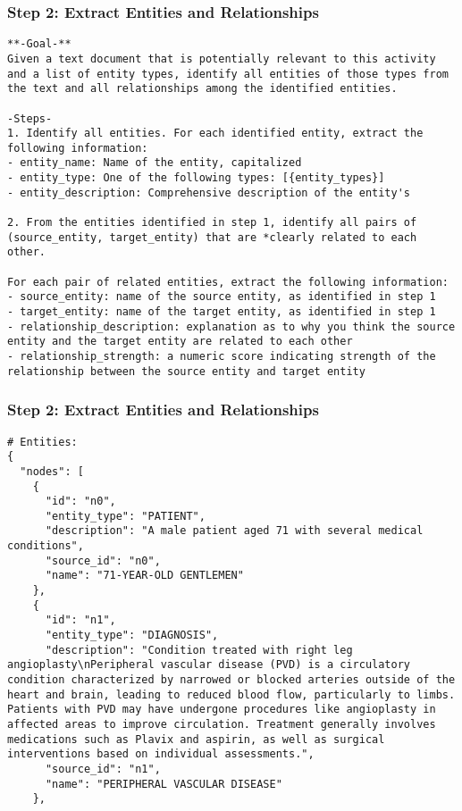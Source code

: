 \begin{frame}[fragile]\frametitle{Step 2: Extract Entities and Relationships}

    \begin{lstlisting}
**-Goal-**
Given a text document that is potentially relevant to this activity and a list of entity types, identify all entities of those types from the text and all relationships among the identified entities.
 
-Steps-
1. Identify all entities. For each identified entity, extract the following information:
- entity_name: Name of the entity, capitalized
- entity_type: One of the following types: [{entity_types}]
- entity_description: Comprehensive description of the entity's 

2. From the entities identified in step 1, identify all pairs of (source_entity, target_entity) that are *clearly related to each other.
 
For each pair of related entities, extract the following information:
- source_entity: name of the source entity, as identified in step 1
- target_entity: name of the target entity, as identified in step 1
- relationship_description: explanation as to why you think the source entity and the target entity are related to each other
- relationship_strength: a numeric score indicating strength of the relationship between the source entity and target entity
    \end{lstlisting}
\end{frame}


\begin{frame}[fragile]\frametitle{Step 2: Extract Entities and Relationships}

    \begin{lstlisting}
# Entities: 
{
  "nodes": [
    {
      "id": "n0",
      "entity_type": "PATIENT",
      "description": "A male patient aged 71 with several medical conditions",
      "source_id": "n0",
      "name": "71-YEAR-OLD GENTLEMEN"
    },
    {
      "id": "n1",
      "entity_type": "DIAGNOSIS",
      "description": "Condition treated with right leg angioplasty\nPeripheral vascular disease (PVD) is a circulatory condition characterized by narrowed or blocked arteries outside of the heart and brain, leading to reduced blood flow, particularly to limbs. Patients with PVD may have undergone procedures like angioplasty in affected areas to improve circulation. Treatment generally involves medications such as Plavix and aspirin, as well as surgical interventions based on individual assessments.",
      "source_id": "n1",
      "name": "PERIPHERAL VASCULAR DISEASE"
    },
    \end{lstlisting}
\end{frame}


